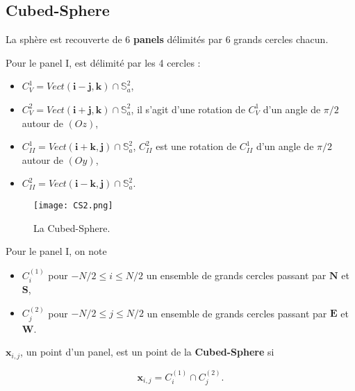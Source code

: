 \documentclass{sciposter}
\begin{document}
\vskip1cm
\begin{multicols}{3} 

\section*{Cubed-Sphere}

La sphère est recouverte de 6 \textbf{panels} délimités par 6 grands cercles chacun.

Pour le panel I, est délimité par les 4 cercles :
\begin{itemize}
\item $C_V^1 = Vect(\mathbf{i}-\mathbf{j}, \mathbf{k}) \cap \mathbb{S}_a^2$,
\item $C_V^2 = Vect(\mathbf{i}+\mathbf{j}, \mathbf{k}) \cap \mathbb{S}_a^2$, il s'agit d'une rotation de $C_V^1$ d'un angle de $\pi/2$ autour de $(Oz)$,
\item $C_{II}^1 = Vect(\mathbf{i}+\mathbf{k}, \mathbf{j}) \cap \mathbb{S}_a^2$, $C_{II}^2$ est une rotation de $C_{II}^1$ d'un angle de $\pi/2$ autour de $(Oy)$,
\item $C_{II}^2 = Vect(\mathbf{i}-\mathbf{k}, \mathbf{j}) \cap \mathbb{S}_a^2$.
\end{itemize}

\begin{figure}
\begin{center}
\texttt{[image: CS2.png]}
\caption{La Cubed-Sphere.}
\end{center}
\end{figure}

Pour le panel I, on note 
\begin{itemize}
\item $C_i^{(1)}$ pour $-N/2 \leq i \leq N/2$ un ensemble de grands cercles passant par $\mathbf{N}$ et $\mathbf{S}$,
\item $C_j^{(2)}$ pour $-N/2 \leq j \leq N/2$ un ensemble de grands cercles passant par $\mathbf{E}$ et $\mathbf{W}$.
\end{itemize} 

$\mathbf{x}_{i,j}$, un point d'un panel, est un point de la \textbf{Cubed-Sphere} si 

\begin{equation}
\mathbf{x}_{i,j} = C_i^{(1)} \cap C_j^{(2)}.
\end{equation}


\begin{figure}[htbp]
\begin{center}
\end{center}
\end{figure}
\end{multicols}
\end{document}
